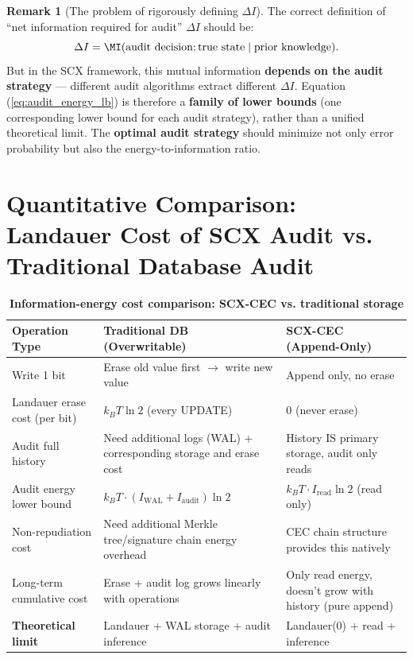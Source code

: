 \documentclass[12pt,a4paper]{article}
\theoremstyle{plain}
\theoremstyle{definition}
\newtheorem{remark}[theorem]{Remark}
\newcommand{\strictness}[1]{{\small\sffamily[#1]}}
\newcommand{\kB}{k_{\!B}}
\begin{document}
\begin{remark}[The problem of rigorously defining $\Delta I$]
\strictness{Core difficulty: non-rigorous}
The correct definition of ``net information required for audit'' $\Delta I$ should be:
\[
\Delta I = \MI(\text{audit decision}; \text{true state} \mid \text{prior knowledge}).
\]
But in the SCX framework, this mutual information \textbf{depends on the audit strategy} --- different audit algorithms extract different $\Delta I$.
Equation (\ref{eq:audit_energy_lb}) is therefore a \textbf{family of lower bounds} (one corresponding lower bound for each audit strategy),
rather than a unified theoretical limit. The \textbf{optimal audit strategy} should minimize not only error probability but also the energy-to-information ratio.
\end{remark}

\section{Quantitative Comparison: Landauer Cost of SCX Audit vs. Traditional Database Audit}
\label{sec:comparison}

\begin{table}[h!]
\centering
\caption{\textbf{Information-energy cost comparison: SCX-CEC vs. traditional storage}}
\label{tab:energy_comparison}
\renewcommand{\arraystretch}{1.6}
\begin{tabular}{@{}p{3.5cm} p{4.5cm} p{4.5cm}@{}}
\toprule
\textbf{Operation Type} & \textbf{Traditional DB (Overwritable)} & \textbf{SCX-CEC (Append-Only)} \\
\midrule
Write 1 bit & Erase old value first $\to$ write new value & Append only, no erase \\
\midrule
Landauer erase cost (per bit) & $\kB T \ln 2$ (every UPDATE) & $0$ (never erase) \\
\midrule
Audit full history & Need additional logs (WAL) + corresponding storage and erase cost & History IS primary storage, audit only reads \\
\midrule
Audit energy lower bound & $\kB T \cdot (I_{\text{WAL}} + I_{\text{audit}}) \ln 2$ & $\kB T \cdot I_{\text{read}} \ln 2$ (read only) \\
\midrule
Non-repudiation cost & Need additional Merkle tree/signature chain energy overhead & CEC chain structure provides this natively \\
\midrule
Long-term cumulative cost & Erase + audit log grows linearly with operations & Only read energy, doesn't grow with history (pure append) \\
\midrule
\textbf{Theoretical limit} & Landauer + WAL storage + audit inference & Landauer(0) + read + inference \\
\bottomrule
\end{tabular}
\end{table}
\end{document}

